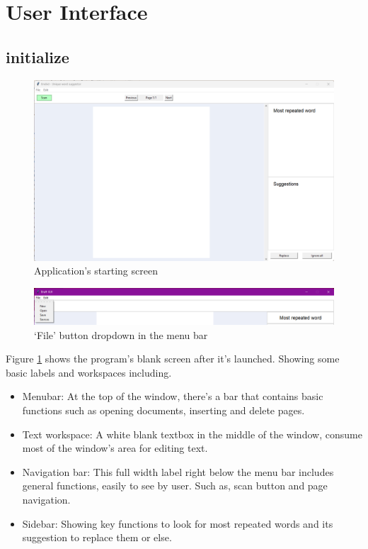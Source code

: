 \documentclass[12pt,oneside,openright,a4paper]{cpe-english-project}
\begin{document}
\section{User Interface}
\subsection{initialize}
\begin{figure}[!h]\centering
\includegraphics[width=15cm]{./img/chp4/Init.png}
\caption{Application’s starting screen}\label{fig:init}
\end{figure}
\begin{figure}[!h]\centering
\includegraphics[width=15cm]{./img/chp4/Bar.png}
\caption{‘File’ button dropdown in the menu bar}\label{fig:bar}
\end{figure}
Figure  \ref{fig:init} shows the program’s blank screen after it’s launched. Showing some basic labels and workspaces including.
\begin{itemize}
\item Menubar: At the top of the window, there’s a bar that contains basic functions such as opening documents, inserting and delete pages.
\item Text workspace: A white blank textbox in the middle of the window, consume most of the window’s area for editing text.
\item Navigation bar: This full width label right below the menu bar includes general functions, easily to see by user. Such as, scan button and page navigation.
\item Sidebar: Showing key functions to look for most repeated words and its suggestion to replace them or
else.
\end{itemize}
\end{document}
